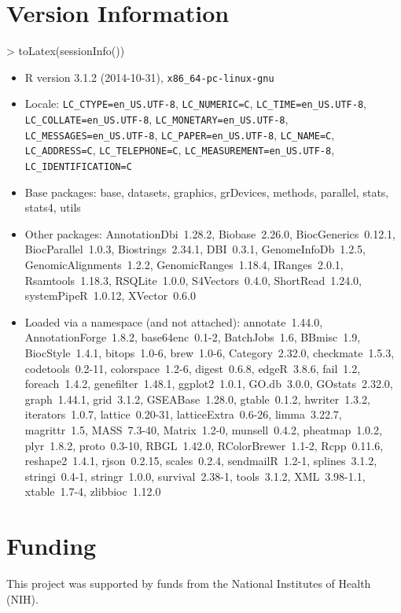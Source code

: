 \documentclass{article}
\begin{document}
\section{Version Information}
\begin{Schunk}
\begin{Sinput}
> toLatex(sessionInfo())
\end{Sinput}
\begin{itemize}\raggedright
  \item R version 3.1.2 (2014-10-31), \verb|x86_64-pc-linux-gnu|
  \item Locale: \verb|LC_CTYPE=en_US.UTF-8|, \verb|LC_NUMERIC=C|, \verb|LC_TIME=en_US.UTF-8|, \verb|LC_COLLATE=en_US.UTF-8|, \verb|LC_MONETARY=en_US.UTF-8|, \verb|LC_MESSAGES=en_US.UTF-8|, \verb|LC_PAPER=en_US.UTF-8|, \verb|LC_NAME=C|, \verb|LC_ADDRESS=C|, \verb|LC_TELEPHONE=C|, \verb|LC_MEASUREMENT=en_US.UTF-8|, \verb|LC_IDENTIFICATION=C|
  \item Base packages: base, datasets, graphics, grDevices, methods, parallel,
    stats, stats4, utils
  \item Other packages: AnnotationDbi~1.28.2, Biobase~2.26.0, BiocGenerics~0.12.1,
    BiocParallel~1.0.3, Biostrings~2.34.1, DBI~0.3.1, GenomeInfoDb~1.2.5,
    GenomicAlignments~1.2.2, GenomicRanges~1.18.4, IRanges~2.0.1, Rsamtools~1.18.3,
    RSQLite~1.0.0, S4Vectors~0.4.0, ShortRead~1.24.0, systemPipeR~1.0.12,
    XVector~0.6.0
  \item Loaded via a namespace (and not attached): annotate~1.44.0,
    AnnotationForge~1.8.2, base64enc~0.1-2, BatchJobs~1.6, BBmisc~1.9,
    BiocStyle~1.4.1, bitops~1.0-6, brew~1.0-6, Category~2.32.0, checkmate~1.5.3,
    codetools~0.2-11, colorspace~1.2-6, digest~0.6.8, edgeR~3.8.6, fail~1.2,
    foreach~1.4.2, genefilter~1.48.1, ggplot2~1.0.1, GO.db~3.0.0, GOstats~2.32.0,
    graph~1.44.1, grid~3.1.2, GSEABase~1.28.0, gtable~0.1.2, hwriter~1.3.2,
    iterators~1.0.7, lattice~0.20-31, latticeExtra~0.6-26, limma~3.22.7,
    magrittr~1.5, MASS~7.3-40, Matrix~1.2-0, munsell~0.4.2, pheatmap~1.0.2,
    plyr~1.8.2, proto~0.3-10, RBGL~1.42.0, RColorBrewer~1.1-2, Rcpp~0.11.6,
    reshape2~1.4.1, rjson~0.2.15, scales~0.2.4, sendmailR~1.2-1, splines~3.1.2,
    stringi~0.4-1, stringr~1.0.0, survival~2.38-1, tools~3.1.2, XML~3.98-1.1,
    xtable~1.7-4, zlibbioc~1.12.0
\end{itemize}\end{Schunk}

\section{Funding}
This project was supported by funds from the National Institutes of Health (NIH).


\end{document}

